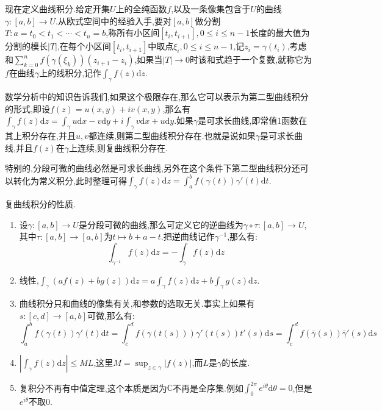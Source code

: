 现在定义曲线积分.给定开集$U$上的全纯函数$f$,以及一条像集包含于$U$的曲线$\gamma:[a,b]\to U$.从欧式空间中的经验入手,要对$[a,b]$做分割$T:a=t_0<t_1<\cdots<t_n=b$,称所有小区间$[t_i,t_{i+1}],0\le i\le n-1$长度的最大值为分割的模长$|T|$,在每个小区间$[t_i,t_{i+1}]$中取点$\xi_i,0\le i\le n-1$,记$z_i=\gamma(t_i)$,考虑和$\sum_{k=0}^nf(\gamma(\xi_k))(z_{i+1}-z_i)$,如果当$|T|\to0$时该和式趋于一个复数,就称它为$f$在曲线$\gamma$上的线积分,记作$\int_{\gamma}f(z)\mathrm{d}z$.

数学分析中的知识告诉我们,如果这个极限存在,那么它可以表示为第二型曲线积分的形式,即设$f(z)=u(x,y)+iv(x,y)$,那么有$\int_{\gamma}f(z)\mathrm{d}z=\int_{\gamma}u\mathrm{d}x-v\mathrm{d}y+i\int_{\gamma}v\mathrm{d}x+u\mathrm{d}y$.如果$\gamma$是可求长曲线,即常值1函数在其上积分存在,并且$u,v$都连续,则第二型曲线积分存在.也就是说如果$\gamma$是可求长曲线,并且$f(z)$在$\gamma$上连续,则复曲线积分存在.

特别的,分段可微的曲线必然是可求长曲线,另外在这个条件下第二型曲线积分还可以转化为常义积分,此时整理可得$\int_{\gamma}f(z)\mathrm{d}z=\int_a^bf(\gamma(t))\gamma'(t)\mathrm{d}t$.

复曲线积分的性质.
\begin{enumerate}
	\item 设$\gamma:[a,b]\to U$是分段可微的曲线,那么可定义它的逆曲线为$\gamma\circ\tau:[a,b]\to U$,其中$\tau:[a,b]\to[a,b]$为$t\mapsto b+a-t$.把逆曲线记作$\gamma^{-1}$,那么有:$$\int_{\gamma^{-1}}f(z)\mathrm{d}z=-\int_{\gamma}f(z)\mathrm{d}z$$
	\item 线性,$\int_{\gamma}\left(af(z)+bg(z)\right)\mathrm{d}z=a\int_{\gamma}f(z)\mathrm{d}z+b\int_{\gamma}g(z)\mathrm{d}z$.
	\item 曲线积分只和曲线的像集有关,和参数的选取无关.事实上如果有$s:[c,d]\to[a,b]$可微,那么有:$$\int_a^bf(\gamma(t))\gamma'(t)\mathrm{d}t=\int_c^df(\gamma(t(s)))\gamma'(t(s))t'(s)\mathrm{d}s=\int_c^df(\overline{\gamma}(s))\overline{\gamma}'(s)\mathrm{d}s$$
	\item $\left|\int_{\gamma}f(z)\mathrm{d}z\right|\le ML$,这里$M=\sup_{z\in\gamma}|f(z)|$,而$L$是$\gamma$的长度.
	\item 复积分不再有中值定理,这个本质是因为$\mathbb{C}$不再是全序集.例如$\int_0^{2\pi}e^{i\theta}\mathrm{d}\theta=0$,但是$e^{i\theta}$不取0.
\end{enumerate}

